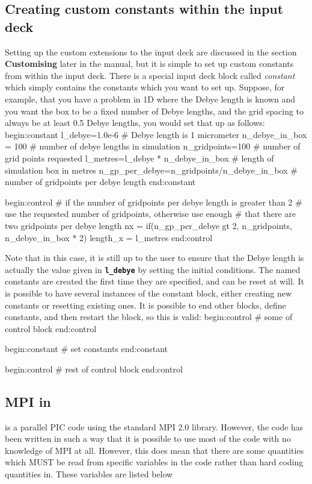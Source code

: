 \documentclass[12pt,a4paper]{article}
\newcommand{\inlinecode}[1]{{\color{warwickred} \bf\texttt{#1}}}
\newcommand{\EPOCH}{{\color{warwickdark}\fontfamily{phv}\selectfont{EPOCH}}}
\newenvironment{boxverbatim}{\lboxverbatim{none}}{\endlboxverbatim}
\begin{document}
\subsection{Creating custom constants within the input deck}
Setting up the custom extensions to the input deck are discussed in the
section {\bf Customising {\EPOCH}} later in the manual, but it is simple to set
up custom constants from within the input deck. There is a special input deck
block called {\it constant} which simply contains the constants which you want
to set up. Suppose, for example, that you have a problem in 1D where the Debye
length is known and you want the box to be a fixed number of Debye lengths,
and the grid spacing to always be at least 0.5 Debye lengths, you would set
that up as follows:
\begin{boxverbatim}
begin:constant
  l_debye=1.0e-6 # Debye length is 1 micrometer
  n_debye_in_box = 100 # number of debye lengths in simulation
  n_gridpoints=100 # number of grid points requested
  l_metres=l_debye * n_debye_in_box # length of simulation box in metres
  n_gp_per_debye=n_gridpoints/n_debye_in_box # number of gridpoints per debye length
end:constant

begin:control
  # if the number of gridpoints per debye length is greater than 2
  # use the requested number of gridpoints, otherwise use enough
  # that there are two gridpoints per debye length
  nx = if(n_gp_per_debye gt 2, n_gridpoints, n_debye_in_box * 2)
  length_x = l_metres
end:control
\end{boxverbatim}

Note that in this case, it is still up to the user to ensure that the Debye
length is actually the value given in \inlinecode{l\_debye} by setting the
initial conditions. The named constants are created the first time they are
specified, and can be reset at will. It is possible to have several instances
of the constant block, either creating new constants or resetting existing
ones. It is possible to end other blocks, define constants, and then
restart the block, so this is valid:
\begin{boxverbatim}
begin:control
   # some of control block
end:control

begin:constant
   # set constants
end:constant

begin:control
   # rest of control block
end:control
\end{boxverbatim}

\subsection{MPI in {\EPOCH}}
{\EPOCH} is a parallel PIC code using the standard MPI 2.0 library. However, the
code has been written in such a way that it is possible to use most of the code
with no knowledge of MPI at all. However, this does mean that there are some
quantities which MUST be read from specific variables in the code rather than
hard coding quantities in. These variables are listed below
\end{document}
